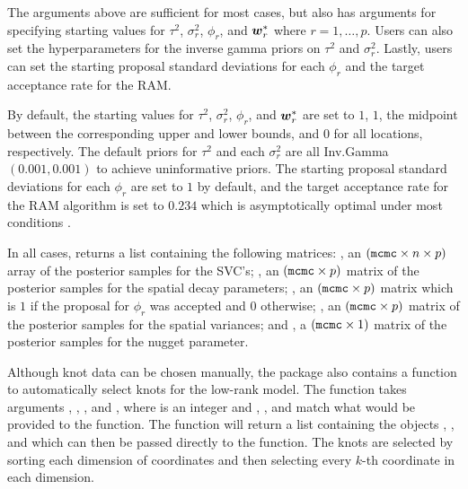 The arguments above are sufficient for most cases, but  also has arguments for specifying starting values for $\tau^2$, $\sigma_r^2$, $\phi_r$, and $\boldsymbol{w}_r^*$ where $r = 1, \dots, p$. Users can also set the hyperparameters for the inverse gamma priors on $\tau^2$ and $\sigma_r^2$. Lastly, users can set the starting proposal standard deviations for each $\phi_r$ and the target acceptance rate for the RAM.

By default, the starting values for $\tau^2$, $\sigma_r^2$, $\phi_r$, and $\boldsymbol{w}_r^*$ are set to $1$, $1$, the midpoint between the corresponding upper and lower bounds, and $0$ for all locations, respectively. The default priors for $\tau^2$ and each $\sigma_r^2$ are all Inv.Gamma$(0.001, 0.001)$ to achieve uninformative priors. The starting proposal standard deviations for each $\phi_r$ are set to $1$ by default, and the target acceptance rate for the RAM algorithm is set to $0.234$ which is asymptotically optimal under most conditions \citep{gelman}.

In all cases,  returns a list containing the following matrices: , an $(\texttt{mcmc} \times n \times p)$ array of the posterior samples for the SVC's; , an $(\texttt{mcmc} \times p)$ matrix of the posterior samples for the spatial decay parameters; , an $(\texttt{mcmc} \times p)$ matrix which is $1$ if the proposal for $\phi_r$ was accepted and $0$ otherwise; , an $(\texttt{mcmc} \times p)$ matrix of the posterior samples for the spatial variances; and , a $(\texttt{mcmc} \times 1)$ matrix of the posterior samples for the nugget parameter.

Although knot data can be chosen manually, the  package also contains a function  to automatically select knots for the low-rank model. The function takes arguments , , , and , where  is an integer and , , and  match what would be provided to the  function. The function will return a list containing the objects , , and  which can then be passed directly to the  function. The knots are selected by sorting each dimension of coordinates and then selecting every $k$-th coordinate in each dimension.

